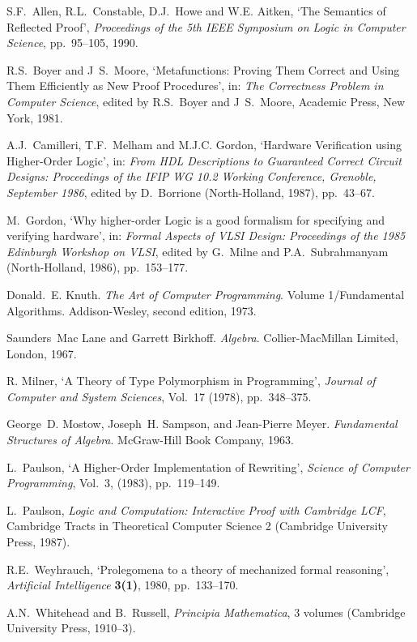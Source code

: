 \begin{thebibliography}{99}

S.F.\ Allen, R.L.\ Constable, D.J.\ Howe and W.E. Aitken,
`The Semantics of Reflected Proof',
{\it Proceedings of the 5th IEEE Symposium on Logic in Computer Science\/},
pp.\ 95--105, 1990.

R.S.\ Boyer and J\ S.\ Moore, `Metafunctions: Proving Them Correct and
Using Them Efficiently as New Proof Procedures', in: {\it The
Correctness Problem in Computer Science}, edited by 
R.S.\ Boyer and J\ S.\ Moore, Academic Press, New York, 1981.

A.J.\ Camilleri, T.F.\ Melham and M.J.C. Gordon,
`Hardware Verification using Higher-Order Logic',
in: {\it From HDL Descriptions to Guaranteed Correct \mbox{Circuit}
Designs: Proceedings of the IFIP WG 10.2 Working Conference, Grenoble, 
September 1986}, edited by D.\ Borrione (North-Holland, 1987), pp.\ 43--67.


M.\ Gordon, 
`Why higher-order Logic
is a good formalism for specifying and verifying hardware',
in: {\it Formal Aspects of VLSI Design: Proceedings of the 1985 Edinburgh
      Workshop on VLSI\/}, edited by G.\ Milne and
P.A.\ Subrahmanyam (North-Holland, 1986), pp.\ 153--177.

Donald.\ E. Knuth.
{\em The Art of Computer Programming}. Volume 1/Fundamental
  Algorithms. Addison-Wesley, second edition, 1973.

Saunders\ Mac Lane and Garrett Birkhoff. {\em Algebra}.
Collier-MacMillan Limited, London, 1967.

R. Milner, 
`A Theory of Type Polymorphism in Programming', 
{\it Journal of Computer and System Sciences}, Vol.\ 17 (1978),
pp.\ 348--375.

George\ D. Mostow, Joseph\ H. Sampson, and Jean-Pierre Meyer.
{\em Fundamental Structures of Algebra}. McGraw-Hill Book Company, 1963.

L.\ Paulson, 
`A Higher-Order Implementation of Rewriting',
{\it Science of Computer Programming}, Vol.\ 3, (1983), pp.\ 119--149.

 L.\ Paulson, 
{\it Logic and Computation: Interactive Proof with Cambridge LCF}, 
Cambridge Tracts in Theoretical Computer Science 2
(Cambridge University Press, 1987).

R.E.\ Weyhrauch, `Prolegomena to a theory of mechanized formal reasoning',
{\it Artificial Intelligence\/} {\bf 3(1)}, 1980, pp.\ 133--170.

A.N.\ Whitehead and B.\ Russell,
{\it Principia Mathematica},
3 volumes (Cambridge University Press, 1910--3).

\end{thebibliography}

